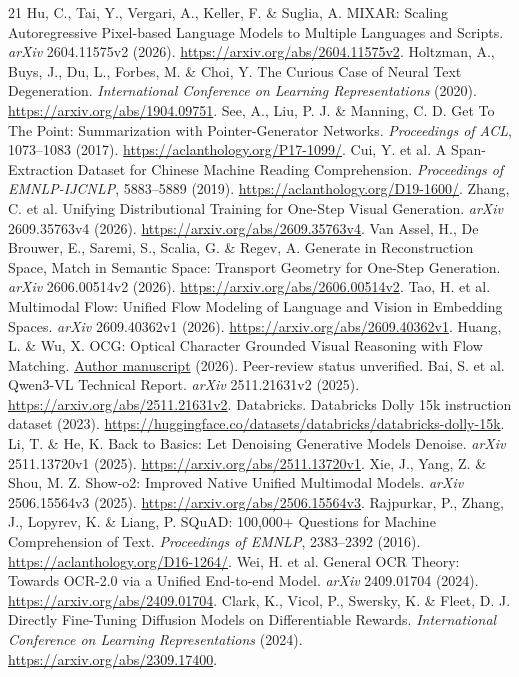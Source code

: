 \documentclass[10pt,a4paper]{article}
\begin{document}
\begin{thebibliography}{21}
 Hu, C., Tai, Y., Vergari, A., Keller, F. \& Suglia, A. MIXAR: Scaling Autoregressive Pixel-based Language Models to Multiple Languages and Scripts. \emph{arXiv} 2604.11575v2 (2026). \url{https://arxiv.org/abs/2604.11575v2}.
 Holtzman, A., Buys, J., Du, L., Forbes, M. \& Choi, Y. The Curious Case of Neural Text Degeneration. \emph{International Conference on Learning Representations} (2020). \url{https://arxiv.org/abs/1904.09751}.
 See, A., Liu, P. J. \& Manning, C. D. Get To The Point: Summarization with Pointer-Generator Networks. \emph{Proceedings of ACL}, 1073--1083 (2017). \url{https://aclanthology.org/P17-1099/}.
 Cui, Y. et al. A Span-Extraction Dataset for Chinese Machine Reading Comprehension. \emph{Proceedings of EMNLP-IJCNLP}, 5883--5889 (2019). \url{https://aclanthology.org/D19-1600/}.
 Zhang, C. et al. Unifying Distributional Training for One-Step Visual Generation. \emph{arXiv} 2609.35763v4 (2026). \url{https://arxiv.org/abs/2609.35763v4}.
 Van Assel, H., De Brouwer, E., Saremi, S., Scalia, G. \& Regev, A. Generate in Reconstruction Space, Match in Semantic Space: Transport Geometry for One-Step Generation. \emph{arXiv} 2606.00514v2 (2026). \url{https://arxiv.org/abs/2606.00514v2}.
 Tao, H. et al. Multimodal Flow: Unified Flow Modeling of Language and Vision in Embedding Spaces. \emph{arXiv} 2609.40362v1 (2026). \url{https://arxiv.org/abs/2609.40362v1}.
 Huang, L. \& Wu, X. OCG: Optical Character Grounded Visual Reasoning with Flow Matching. \href{https://www.alphaxiv.org/abs/2608.ocg-optical-character-grounded-reasoning}{Author manuscript} (2026). Peer-review status unverified.
 Bai, S. et al. Qwen3-VL Technical Report. \emph{arXiv} 2511.21631v2 (2025). \url{https://arxiv.org/abs/2511.21631v2}.
 Databricks. Databricks Dolly 15k instruction dataset (2023). \url{https://huggingface.co/datasets/databricks/databricks-dolly-15k}.
 Li, T. \& He, K. Back to Basics: Let Denoising Generative Models Denoise. \emph{arXiv} 2511.13720v1 (2025). \url{https://arxiv.org/abs/2511.13720v1}.
 Xie, J., Yang, Z. \& Shou, M. Z. Show-o2: Improved Native Unified Multimodal Models. \emph{arXiv} 2506.15564v3 (2025). \url{https://arxiv.org/abs/2506.15564v3}.
 Rajpurkar, P., Zhang, J., Lopyrev, K. \& Liang, P. SQuAD: 100,000+ Questions for Machine Comprehension of Text. \emph{Proceedings of EMNLP}, 2383--2392 (2016). \url{https://aclanthology.org/D16-1264/}.
 Wei, H. et al. General OCR Theory: Towards OCR-2.0 via a Unified End-to-end Model. \emph{arXiv} 2409.01704 (2024). \url{https://arxiv.org/abs/2409.01704}.
 Clark, K., Vicol, P., Swersky, K. \& Fleet, D. J. Directly Fine-Tuning Diffusion Models on Differentiable Rewards. \emph{International Conference on Learning Representations} (2024). \url{https://arxiv.org/abs/2309.17400}.
\end{thebibliography}
\end{document}
